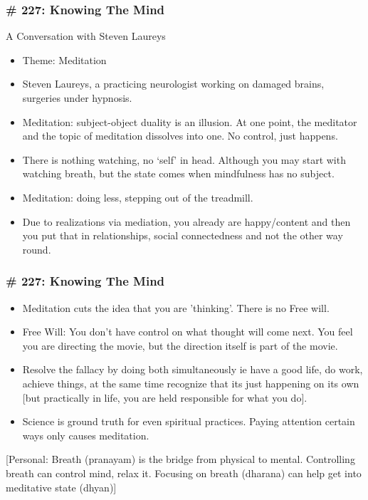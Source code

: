 \begin{frame}[fragile]
\frametitle{\# 227: Knowing The Mind}

 A Conversation with Steven Laureys

\begin{itemize}
\item Theme: Meditation
\item  Steven Laureys, a practicing neurologist working on damaged brains, surgeries under hypnosis.
\item  Meditation: subject-object duality is an illusion. At one point, the meditator and the topic of meditation dissolves into one. No control, just happens.
\item  There is nothing watching, no `self' in head. Although you may start with watching breath, but the state comes when mindfulness has no subject.
\item  Meditation: doing less, stepping out of the treadmill.
\item  Due to realizations via mediation, you already are happy/content and then you put that in relationships, social connectedness and not the other way round.
\end{itemize}


\end{frame}

\begin{frame}[fragile]
\frametitle{\# 227: Knowing The Mind}

\begin{itemize}
\item Meditation cuts the idea that you are 'thinking'. There is no Free will.
\item  Free Will: You don't have control on what thought will come next. You feel you are directing the movie, but the direction itself is part of the movie.
\item  Resolve the fallacy by doing both simultaneously ie have a good life, do work, achieve things, at the same time recognize that its just happening on its own [but practically in life, you are held responsible for what you do].
\item  Science is ground truth for even spiritual practices. Paying attention certain ways only causes meditation.
\end{itemize}

[Personal: Breath (pranayam) is the bridge from physical to mental. Controlling breath can control mind, relax it. Focusing on breath (dharana) can help get into meditative state (dhyan)]
\end{frame}

